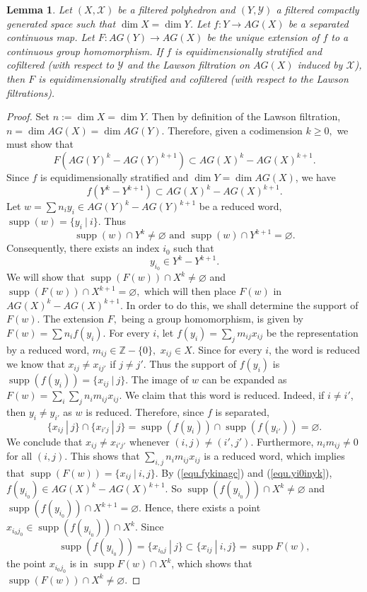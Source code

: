 \documentclass{amsart}
\newtheorem{lemma}[thm]{Lemma}
\theoremstyle{definition}
\theoremstyle{remark}
\newcommand {\Xa}    {\ensuremath{\mathcal{X}}}
\newcommand {\Ya}    {\ensuremath{\mathcal{Y}}}
\newcommand {\intg}  {\ensuremath{\mathbb{Z}}}
\newcommand {\supp}  {\ensuremath{\operatorname{supp}}}
\begin{document}
\begin{lemma} \label{lem.extensionisequistrat}
Let $(X,\Xa)$ be a filtered polyhedron and $(Y,\Ya)$ a filtered compactly
generated space such that $\dim X = \dim Y$.
Let $f: Y \to AG(X)$ be a separated continuous map.
Let $F: AG(Y) \to AG(X)$ be the unique extension of
$f$ to a continuous group homomorphism.
If $f$ is equidimensionally stratified and cofiltered
(with respect to $\Ya$ and the
Lawson filtration on $AG(X)$ induced by $\Xa$), then
$F$ is equidimensionally stratified and cofiltered
(with respect to the Lawson filtrations).
\end{lemma}
\begin{proof}
Set $n := \dim X = \dim Y$. Then by definition of the Lawson filtration,
$n = \dim AG(X)=\dim AG(Y).$
Therefore, given a codimension $k\geq 0,$
we must show that 
\[ F(AG(Y)^k - AG(Y)^{k+1}) \subset AG(X)^k - AG(X)^{k+1}.\]
Since $f$ is equidimensionally stratified
and $\dim Y= \dim AG(X)$, we have
\begin{equation} \label{equ.fykinagc}
f(Y^k - Y^{k+1}) \subset AG(X)^k - AG(X)^{k+1}. 
\end{equation}
Let 
$w=\sum n_i y_i \in AG(Y)^k - AG(Y)^{k+1}$
be a reduced word, $\supp (w) = \{ y_i ~|~ i \}$.
Thus
\[ \supp (w) \cap Y^k \not= \varnothing \text{ and }
   \supp (w) \cap Y^{k+1} = \varnothing. \]
Consequently, there exists an index $i_0$ such that
\begin{equation} \label{equ.yi0inyk}
y_{i_0} \in Y^k - Y^{k+1}. 
\end{equation}
We will show that
$\supp (F(w)) \cap X^k \not= \varnothing$ and
$\supp (F(w)) \cap X^{k+1} = \varnothing,$
which will then place $F(w)$ in $AG(X)^k - AG(X)^{k+1}$.
In order to do this, we shall determine the support of $F(w)$.
The extension $F,$ being a group homomorphism, is given by
$F(w) = \sum n_i f(y_i).$
For every $i$, let 
$f(y_i) = \sum_j m_{ij} x_{ij}$
be the representation by a reduced word, $m_{ij} \in \intg - \{ 0\},$
$x_{ij} \in X$. Since for every $i$, the word is reduced we know
that $x_{ij} \not= x_{ij'}$ if $j\not= j'$.
Thus the support of $f(y_i)$ is
$\supp (f(y_i)) = \{ x_{ij} ~|~ j \}.$
The image of $w$ can be expanded as
$F(w) = \sum_i \sum_j n_i m_{ij} x_{ij}.$
We claim that this word is reduced.
Indeed, if $i\not= i'$, then $y_i \not= y_{i'}$ as $w$ is reduced.
Therefore, since $f$ is separated, 
\[ \{ x_{ij} ~|~ j \} \cap \{ x_{i' j} ~|~ j \}
  = \supp (f(y_i)) \cap \supp (f(y_{i'})) = \varnothing.  \]
We conclude that 
$x_{ij} \not= x_{i' j'}$ whenever $(i,j) \not= (i',j')$.
Furthermore, $n_i m_{ij} \not= 0$ for all $(i,j)$.
This shows that $\sum_{i,j} n_i m_{ij} x_{ij}$ is a reduced word,
which implies that
$\supp (F(w)) = \{ x_{ij} ~|~ i,j \}.$
By (\ref{equ.fykinagc}) and (\ref{equ.yi0inyk}),
$f(y_{i_0}) \in AG(X)^k - AG(X)^{k+1}.$
So
$\supp (f(y_{i_0})) \cap X^k \not= \varnothing$ and
$\supp (f(y_{i_0})) \cap X^{k+1} = \varnothing.$
Hence, there exists a point
$x_{i_0 j_0} \in \supp (f(y_{i_0})) \cap X^k$.
Since
\[ \supp (f(y_{i_0})) = \{ x_{i_0 j} ~|~ j \}
  \subset \{ x_{ij} ~|~ i,j \} = \supp F(w), \]
the point $x_{i_0 j_0}$ is in $\supp F(w) \cap X^k$, which shows that
$\supp (F(w)) \cap X^k \not= \varnothing$.


\end{proof}
\end{document}
